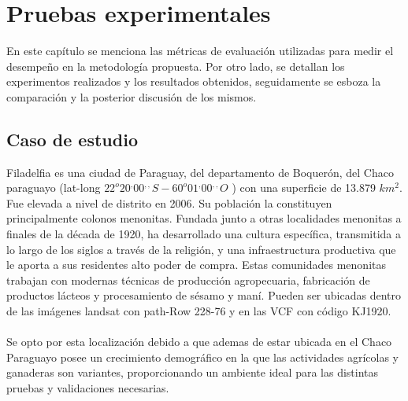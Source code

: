 \newpage{\ } 
\thispagestyle{empty} 

\chapter{Pruebas experimentales}
En este capítulo se menciona las m\'etricas de evaluaci\'on utilizadas para medir el desempe\~{n}o en la metodolog\'ia propuesta. Por otro lado, se detallan los experimentos realizados y los resultados obtenidos, seguidamente se esboza la comparaci\'on y la posterior discusi\'on de los mismos.

\section{Caso de estudio}
Filadelfia es una ciudad de Paraguay, del departamento de Boquer\'on, del Chaco paraguayo (lat-long $22^{o}20^{,}00^{,,} S - 60^{o}01^{,} 00^{,,} O$ ) con una superficie de 13.879 $ km^{2} $. Fue elevada a nivel de distrito en 2006. Su poblaci\'on la constituyen principalmente colonos menonitas. Fundada junto a otras localidades menonitas a finales de la d\'ecada de 1920, ha desarrollado una cultura espec\'ifica, transmitida a lo largo de los siglos a trav\'es de la religi\'on, y una infraestructura productiva que le aporta a sus residentes alto poder de compra. Estas comunidades menonitas trabajan con modernas t\'ecnicas de producci\'on agropecuaria, fabricaci\'on de productos l\'acteos y procesamiento de s\'esamo y man\'i. Pueden ser ubicadas dentro de las im\'agenes landsat con path-Row 228-76 y en las VCF con c\'odigo KJ1920.\\~\\
Se opto por esta localizaci\'on debido a que ademas de estar ubicada en el Chaco Paraguayo posee un crecimiento demogr\'afico en la que las actividades agr\'icolas y ganaderas son variantes, proporcionando un ambiente ideal para las distintas pruebas y validaciones necesarias.\\~\\

